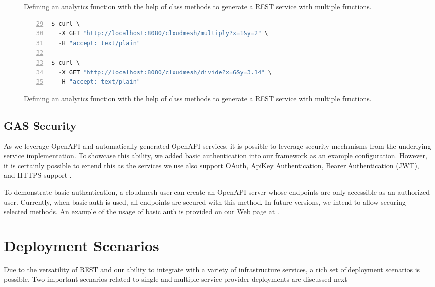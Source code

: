 \begin{figure}[htb]
\caption{Defining an analytics function with the help of class methods to generate a REST service with multiple functions.}
\label{fig:class}

\bigskip
\begin{lstlisting}[language=Python,
                   firstnumber=29,
                   basicstyle=\ttfamily\FONT,
                   numbers=left,                   
                   numbersep=5pt,
                   xleftmargin=5mm]
$ curl \ 
  -X GET "http://localhost:8080/cloudmesh/multiply?x=1&y=2" \
  -H "accept: text/plain"

$ curl \ 
  -X GET "http://localhost:8080/cloudmesh/divide?x=6&y=3.14" \
  -H "accept: text/plain"

\end{lstlisting}

\caption{Defining an analytics function with the help of class methods to generate a REST service with multiple functions.}
\label{fig:class-curl}

\end{figure}


\subsection{GAS Security}

As we leverage OpenAPI and automatically generated OpenAPI services, it is possible to leverage security mechanisms from the underlying service implementation. To showcase this ability, we added basic authentication into our framework as an example configuration. However, it is certainly possible to extend this as the services we use also support OAuth, ApiKey Authentication, Bearer Authentication (JWT), and HTTPS support \cite{connexion-security}\cite{cloudmesh-openapi}.

To demonstrate basic authentication, a cloudmesh user can create an OpenAPI server whose endpoints are only
accessible as an authorized user. Currently, when basic auth is used, all endpoints are secured with this method. In future versions, we intend to allow securing selected methods.
An example of the usage of basic auth is provided on our Web page at \cite{www-cloudmesh-openapi-security}.

\section{Deployment Scenarios}

Due to the versatility of REST and our ability to integrate with a variety of infrastructure services, a rich set of deployment scenarios is possible. Two important scenarios related to single and multiple service provider deployments are discussed next. 

